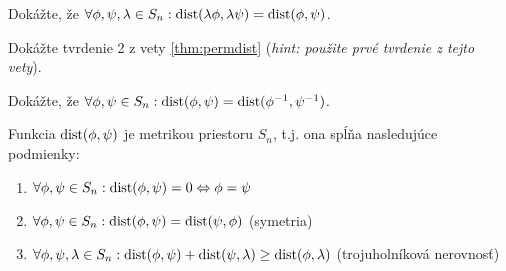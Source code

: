 \begin{exercise}
\label{exer:permdist1}
Dokážte, že $\forall \phi, \psi, \lambda \in S_n: {\rm dist}(\lambda\phi, \lambda\psi) = {\rm dist}(\phi, \psi)$.
\end{exercise}

\begin{exercise}
\label{exer:permdist2}
Dokážte tvrdenie 2 z vety \ref{thm:permdist} (\emph{hint: použite prvé tvrdenie z tejto vety}).
\end{exercise}


\begin{exercise}
Dokážte, že $\forall \phi, \psi \in S_n: {\rm dist}(\phi, \psi) = {\rm dist}(\phi^{-1}, \psi^{-1})$.
\end{exercise}



\begin{theorem}
    Funkcia ${\rm dist}(\phi, \psi)$ je metrikou priestoru $S_n$, t.j. ona spĺňa nasledujúce podmienky:
    \begin{enumerate}
        \item $ \forall \phi, \psi \in S_n: {\rm dist}(\phi, \psi) = 0 \Leftrightarrow \phi = \psi$
        \item $ \forall \phi, \psi \in S_n: {\rm dist}(\phi, \psi) = {\rm dist}(\psi, \phi)$ (symetria)
        \item $ \forall \phi, \psi, \lambda \in S_n: {\rm dist}(\phi, \psi) + {\rm dist}(\psi, \lambda) \geq {\rm dist}(\phi, \lambda)$ (trojuholníková nerovnosť)  
    \end{enumerate}
\end{theorem}

